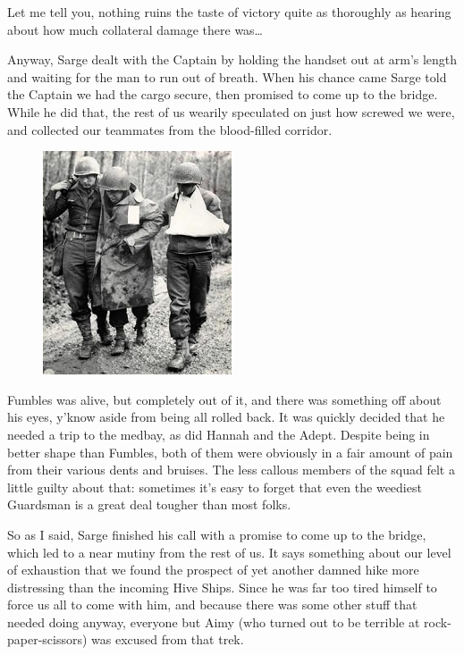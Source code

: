 Let me tell you, nothing ruins the taste of victory quite as thoroughly as hearing about how much collateral damage there was…

Anyway, Sarge dealt with the Captain by holding the handset out at arm's length and waiting for the man to run out of breath. 
When his chance came Sarge told the Captain we had the cargo secure, then promised to come up to the bridge. 
While he did that, the rest of us wearily speculated on just how screwed we were, and collected our teammates from the blood-filled corridor.

\begin{figure}
	\begin{center}
		\includegraphics[width=\figwidth]{pics/12/70.png}
	\end{center}
\end{figure}
Fumbles was alive, but completely out of it, and there was something off about his eyes, y'know aside from being all rolled back. 
It was quickly decided that he needed a trip to the medbay, as did Hannah and the Adept. 
Despite being in better shape than Fumbles, both of them were obviously in a fair amount of pain from their various dents and bruises. 
The less callous members of the squad felt a little guilty about that: 
sometimes it's easy to forget that even the weediest Guardsman is a great deal tougher than most folks.

So as I said, Sarge finished his call with a promise to come up to the bridge, which led to a near mutiny from the rest of us. 
It says something about our level of exhaustion that we found the prospect of yet another damned hike more distressing than the incoming Hive Ships. 
Since he was far too tired himself to force us all to come with him, and because there was some other stuff that needed doing anyway, everyone but Aimy (who turned out to be terrible at rock-paper-scissors) was excused from that trek.

